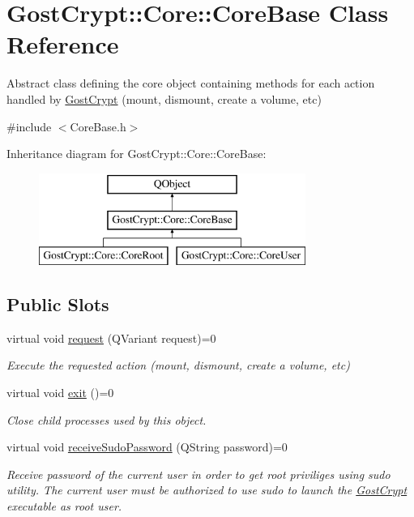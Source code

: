 \hypertarget{class_gost_crypt_1_1_core_1_1_core_base}{}\section{Gost\+Crypt\+:\+:Core\+:\+:Core\+Base Class Reference}
\label{class_gost_crypt_1_1_core_1_1_core_base}


Abstract class defining the core object containing methods for each action handled by \hyperlink{namespace_gost_crypt}{Gost\+Crypt} (mount, dismount, create a volume, etc)  




{\ttfamily \#include $<$Core\+Base.\+h$>$}

Inheritance diagram for Gost\+Crypt\+:\+:Core\+:\+:Core\+Base\+:\begin{figure}[H]
\begin{center}
\leavevmode
\includegraphics[height=3.000000cm]{class_gost_crypt_1_1_core_1_1_core_base}
\end{center}
\end{figure}
\subsection*{Public Slots}
\begin{DoxyCompactItemize}
\item 
virtual void \hyperlink{class_gost_crypt_1_1_core_1_1_core_base_a50e21a6636cfa9fc438eddc63dd9db11}{request} (Q\+Variant request)=0
\begin{DoxyCompactList}\small\item\em Execute the requested action (mount, dismount, create a volume, etc) \end{DoxyCompactList}\item 
virtual void \hyperlink{class_gost_crypt_1_1_core_1_1_core_base_a240a009c4f481a8d84292caaead91fd5}{exit} ()=0
\begin{DoxyCompactList}\small\item\em Close child processes used by this object. \end{DoxyCompactList}\item 
virtual void \hyperlink{class_gost_crypt_1_1_core_1_1_core_base_ad0026630165d5b7229e486cca733ad05}{receive\+Sudo\+Password} (Q\+String password)=0
\begin{DoxyCompactList}\small\item\em Receive password of the current user in order to get root priviliges using sudo utility. The current user must be authorized to use sudo to launch the \hyperlink{namespace_gost_crypt}{Gost\+Crypt} executable as root user. \end{DoxyCompactList}\end{DoxyCompactItemize}
